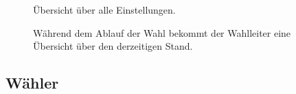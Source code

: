 \documentclass[parskip=full,11pt,twoside]{scrartcl}
\begin{document}
\begin{figure}[hb]
	\caption{\label{fig:wlltr-done}
		Übersicht über alle Einstellungen.
	}
\end{figure}

\begin{figure}[hb]
	\caption{\label{fig:wlltr-status}
		Während dem Ablauf der Wahl bekommt der Wahlleiter eine Übersicht über den derzeitigen Stand.
	}
\end{figure}

\subsection{Wähler}
\end{document}
